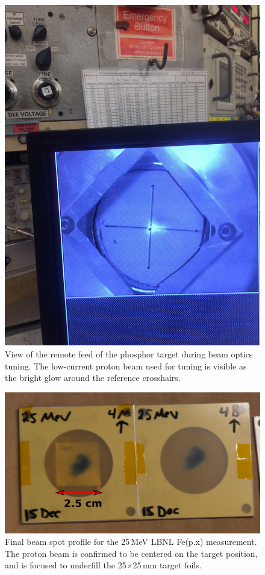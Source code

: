 \begin{figure}
 \centering
 \includegraphics[width=0.75\columnwidth]{./figures/IMG_0337.jpg}
 \caption{View of the remote feed of the phosphor target during beam optics tuning. The low-current proton beam used for tuning is visible as the bright glow around the reference crosshairs.}
 \label{fig:fe_preexp_beam_spot}
\end{figure}



\begin{figure}
 \centering
 \includegraphics[width=0.75\columnwidth]{./figures/25MeV_optics_films.png}
 \caption{Final beam spot profile for the 25\,MeV LBNL Fe(p.x) measurement. The  proton beam is confirmed to be centered on the target position, and is focused to underfill the 25$\times$25\,mm target foils.}
 \label{fig:fe25_preexp_beam_spot}
\end{figure}

